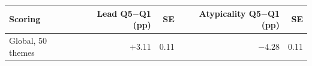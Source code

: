\begin{tabular}{lrrrr}
\toprule
Scoring & Lead Q5$-$Q1 (pp) & SE & Atypicality Q5$-$Q1 (pp) & SE \\
\midrule
Global, 50 themes & $+3.11$ & 0.11 & $-4.28$ & 0.11 \\
\bottomrule
\end{tabular}
